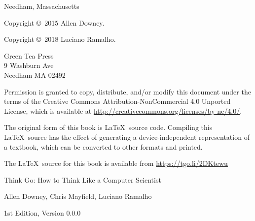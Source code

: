 \documentclass[10pt]{book}
\newcommand{\thetitle}{Think Go: How to Think Like a Computer Scientist}
\newcommand{\theversion}{1st Edition, Version 0.0.0}
\newcommand{\thedate}{}
\begin{document}
\begin{latexonly}
\begin{flushright}
{\small Needham, Massachusetts}

\vfill

\end{flushright}


\pagebreak
\thispagestyle{empty}

{\small
Copyright \copyright ~2015 Allen Downey.

Copyright \copyright ~2018 Luciano Ramalho.


\vspace{0.2in}

\begin{flushleft}
Green Tea Press       \\
9 Washburn Ave        \\
Needham MA 02492
\end{flushleft}

Permission is granted to copy, distribute, and/or modify this document
under the terms of the Creative Commons Attribution-NonCommercial 4.0 Unported
License, which is available at \url{http://creativecommons.org/licenses/by-nc/4.0/}.

The original form of this book is \LaTeX\ source code.  Compiling this
\LaTeX\ source has the effect of generating a device-independent
representation of a textbook, which can be converted to other formats
and printed.

The \LaTeX\ source for this book is available from
\url{https://tgo.li/2DKtewu}

\vspace{0.2in}

} %

\end{latexonly}


\begin{htmlonly}


{\Large \thetitle}

{\large Allen Downey, Chris Mayfield, Luciano Ramalho}

\theversion

\thedate

\setcounter{chapter}{-1}

\end{htmlonly}

\fi
\end{document}
